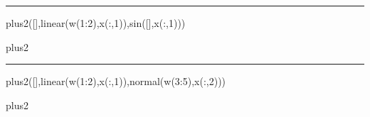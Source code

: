 \documentclass[12pt]{article}
\begin{document}
\hrule

plus2([],linear(w(1:2),x(:,1)),sin([],x(:,1)))

\begin{bundle}{plus2}\end{bundle}

\hrule

plus2([],linear(w(1:2),x(:,1)),normal(w(3:5),x(:,2)))

\begin{bundle}{plus2}\end{bundle}
\end{document}
